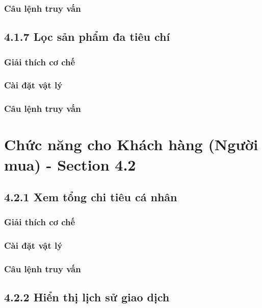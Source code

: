 \subsubsection{Câu lệnh truy vấn}

\subsection{4.1.7 Lọc sản phẩm đa tiêu chí}

\subsubsection{Giải thích cơ chế}

\subsubsection{Cài đặt vật lý}

\subsubsection{Câu lệnh truy vấn}

\section{Chức năng cho Khách hàng (Người mua) - Section 4.2}

\subsection{4.2.1 Xem tổng chi tiêu cá nhân}

\subsubsection{Giải thích cơ chế}

\subsubsection{Cài đặt vật lý}

\subsubsection{Câu lệnh truy vấn}

\subsection{4.2.2 Hiển thị lịch sử giao dịch}

